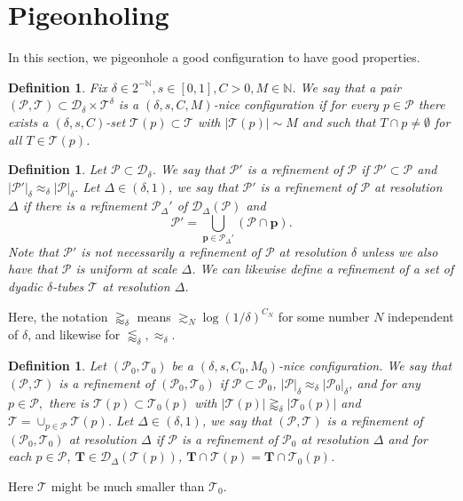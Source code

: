 \documentclass{amsart}
\newtheorem{definition}[prop]{Definition}
\newcommand{\T}{\mathcal{T}}
\newcommand{\bp}{\mathbf{p}}
\newcommand{\bT}{\mathbf{T}}
\newcommand{\cD}{\mathcal{D}}
\newcommand{\cT}{\mathcal{T}}
\newcommand{\cP}{\mathcal{P}}
\begin{document}


\section{Pigeonholing}
In this section, we pigeonhole a good configuration to have good properties.

\begin{definition}
    Fix $\delta\in 2^{-\mathbb{N}}, s\in [0,1], C>0, M\in \mathbb{N}$. We say that a pair $(\mathcal{P}, \mathcal{T})\subset \mathcal{D}_{\delta}\times \mathcal{T}^{\delta}$ is a $(\delta, s, C, M)$-nice configuration if for every $p\in \mathcal{P}$ there exists a $(\delta, s, C)$-set $\mathcal{T}(p)\subset \mathcal{T}$ with $|\mathcal{T}(p)|\sim M$ and such that $T\cap p\neq \emptyset$ for all $T\in \mathcal{T}(p)$. 
\end{definition}

\begin{definition}
    Let $\cP\subset \cD_{\delta}$. We say that $\cP'$ is a refinement of $\cP$ if $\cP'\subset \cP$ and $|\cP'|_{\delta}\approx_{\delta} |\cP|_{\delta}.$ Let $\Delta\in (\delta, 1)$, we say that $\cP'$ is a refinement of $\cP$ at resolution $\Delta$ if there is a refinement $\cP_{\Delta}'$ of $\cD_{\Delta}(\cP)$ and \[ \cP'=\bigcup_{\bp\in \cP_{\Delta}'}(\cP\cap \bp).\] 
    Note that $\cP'$ is not necessarily a refinement of $\cP$ at resolution $\delta$ unless we also have that $\cP$ is uniform at scale $\Delta$. We can likewise define a refinement of a set of dyadic $\delta$-tubes $\T$ at resolution $\Delta$.
\end{definition}
Here, the notation $\gtrapprox_\delta$ means $\gtrsim_N \log(1/\delta)^{C_N}$ for some number $N$ independent of $\delta$, and likewise for $\lessapprox_\delta, \approx_\delta$.

\begin{definition}
    Let $(\cP_0, \cT_0)$ be a $(\delta, s, C_0, M_0)$-nice configuration. We say that $(\cP, \cT)$ is a refinement of $(\cP_0, \cT_0)$ if $\cP\subset \cP_0$, $|\cP|_{\delta}\approx_{\delta} |\cP_0|_{\delta}$, and for any $p\in \cP,$ there is $\cT(p)\subset \cT_0(p)$ with $|\cT(p)|\gtrapprox_{\delta} |\cT_0(p)|$ and $\cT=\cup_{p\in \cP} \cT(p)$. Let $\Delta\in (\delta, 1)$, we say that $(\cP, \cT)$ is a refinement of $(\cP_0,\cT_0)$ at resolution $\Delta$ if $\cP$ is a refinement of $\cP_0$ at resolution $\Delta$ and for each $p\in \cP$, $\bT\in \cD_{\Delta}(\cT(p))$, $\bT\cap \cT(p)=\bT\cap \cT_0(p)$. 
\end{definition}
Here $\cT$ might be much smaller than $\cT_0$. 
\end{document}
